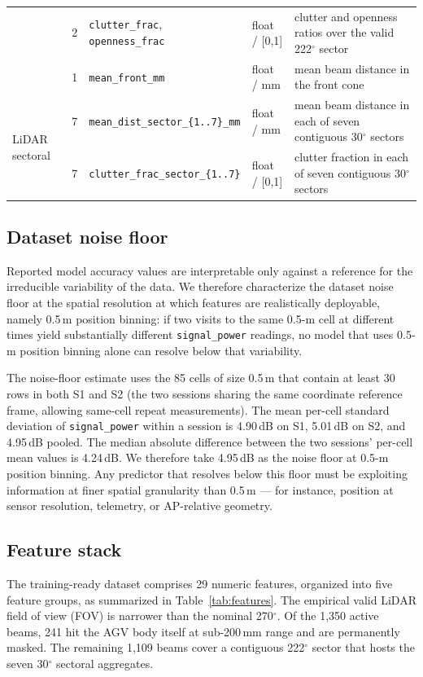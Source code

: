 \documentclass[conference]{IEEEtran}
\begin{document}
\begin{table}[!t]
\begin{tabular}{l c p{} l p{}}
                             & 2  & \texttt{clutter\_frac}, \texttt{openness\_frac} & float / [0,1] & clutter and openness ratios over the valid 222$^{\circ}$ sector \\
                             & 1  & \texttt{mean\_front\_mm}                  & float / mm       & mean beam distance in the front cone \\[1pt]
        \midrule
        \multirow{2}{*}{LiDAR sectoral} & 7 & \texttt{mean\_dist\_sector\_\{1..7\}\_mm} & float / mm  & mean beam distance in each of seven contiguous 30$^{\circ}$ sectors \\
                             & 7  & \texttt{clutter\_frac\_sector\_\{1..7\}}  & float / [0,1]    & clutter fraction in each of seven contiguous 30$^{\circ}$ sectors \\
        \bottomrule
    \end{tabular}
    \vspace{-8pt}
\end{table}


\subsection{Dataset noise floor}
\label{sec:noisefloor}
Reported model accuracy values are interpretable only against a reference for the irreducible variability of the data. We therefore characterize the dataset noise floor at the spatial resolution at which features are realistically deployable, namely 0.5\,m position binning: if two visits to the same 0.5-m cell at different times yield substantially different \texttt{signal\_power} readings, no model that uses 0.5-m position binning alone can resolve below that variability.

The noise-floor estimate uses the 85 cells of size 0.5\,m that contain at least 30 rows in both S1 and S2 (the two sessions sharing the same coordinate reference frame, allowing same-cell repeat measurements). The mean per-cell standard deviation of \texttt{signal\_power} within a session is 4.90\,dB on S1, 5.01\,dB on S2, and 4.95\,dB pooled. The median absolute difference between the two sessions' per-cell mean values is 4.24\,dB. We therefore take 4.95\,dB as the noise floor at 0.5-m position binning. Any predictor that resolves below this floor must be exploiting information at finer spatial granularity than 0.5\,m --- for instance, position at sensor resolution, telemetry, or AP-relative geometry.

\subsection{Feature stack}
\label{sec:features}
The training-ready dataset comprises 29 numeric features, organized into five feature groups, as summarized in Table~\ref{tab:features}.
The empirical valid LiDAR field of view (FOV) is narrower than the nominal 270$^{\circ}$. Of the 1{,}350 active beams, 241 hit the AGV body itself at sub-200\,mm range and are permanently masked. The remaining 1{,}109 beams cover a contiguous 222$^{\circ}$ sector that hosts the seven 30$^{\circ}$ sectoral aggregates. 
\end{document}
